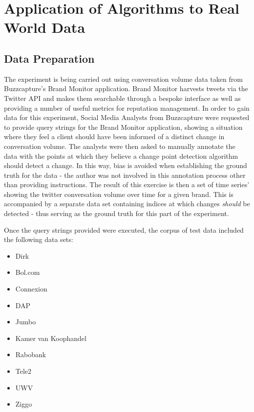 \documentclass{uvamscse}	%
\begin{document}
\section{Application of Algorithms to Real World Data}
\label{real world explainer}

\subsection{Data Preparation}

The experiment is being carried out using conversation volume data taken from Buzzcapture's Brand Monitor application. Brand Monitor harvests tweets via the Twitter API and makes them searchable through a bespoke interface as well as providing a number of useful metrics for reputation management. In order to gain data for this experiment, Social Media Analysts from Buzzcapture were requested to provide query strings for the Brand Monitor application, showing a situation where they feel a client should have been informed of a distinct change in conversation volume. The analysts were then asked to manually annotate the data with the points at which they believe a change point detection algorithm should detect a change. In this way, bias is avoided when establishing the ground truth for the data - the author was not involved in this annotation process other than providing instructions. The result of this exercise is then a set of time series' showing the twitter conversation volume over time for a given brand. This is accompanied by a separate data set containing indices at which changes \emph{should} be detected - thus serving as the ground truth for this part of the experiment.

Once the query strings provided were executed, the corpus of test data included the following data sets:

\begin{itemize}
    \item Dirk
    \item Bol.com
    \item Connexion
    \item DAP
    \item Jumbo
    \item Kamer van Koophandel
    \item Rabobank
    \item Tele2
    \item UWV
    \item Ziggo
\end{itemize}
\end{document}
